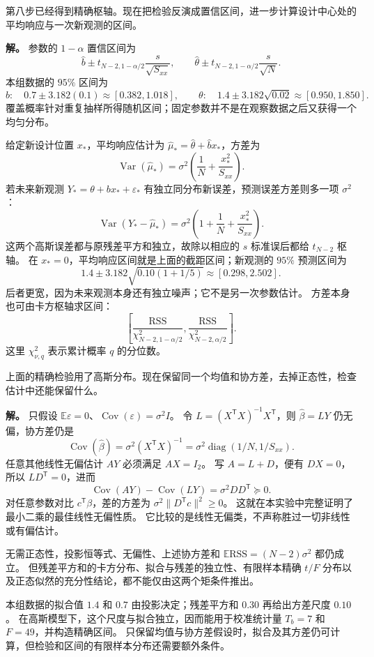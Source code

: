 \begin{exbox}[参数置信区间与新观测预测区间]
第八步已经得到精确枢轴。现在把检验反演成置信区间，进一步计算设计中心处的平均响应与一次新观测的区间。

\textbf{解。} 参数的 $1-\alpha$ 置信区间为
\[
 \widehat b\pm t_{N-2,1-\alpha/2}\frac{s}{\sqrt{S_{xx}}},
 \qquad \widehat\theta\pm t_{N-2,1-\alpha/2}\frac{s}{\sqrt N}.
\]
本组数据的 $95\%$ 区间为
\[
 b:\quad0.7\pm3.182(0.1)\approx[0.382,1.018],
 \qquad
 \theta:\quad1.4\pm3.182\sqrt{0.02}\approx[0.950,1.850].
\]
覆盖概率针对重复抽样所得随机区间；固定参数并不是在观察数据之后又获得一个均匀分布。

给定新设计位置 $x_*$，平均响应估计为 $\widehat\mu_*=\widehat\theta+\widehat b x_*$，方差为
\[
 \operatorname{Var}(\widehat\mu_*)
 =\sigma^2\left(\frac1N+\frac{x_*^2}{S_{xx}}\right).
\]
若未来新观测 $Y_*=\theta+b x_*+\varepsilon_*$ 有独立同分布新误差，预测误差方差则多一项 $\sigma^2$：
\[
 \operatorname{Var}(Y_*-\widehat\mu_*)
 =\sigma^2\left(1+\frac1N+\frac{x_*^2}{S_{xx}}\right).
\]
这两个高斯误差都与原残差平方和独立，故除以相应的 $s$ 标准误后都给 $t_{N-2}$ 枢轴。
在 $x_*=0$，平均响应区间就是上面的截距区间；新观测的 $95\%$ 预测区间为
\[
 1.4\pm3.182\sqrt{0.10(1+1/5)}
 \approx[0.298,2.502].
\]
后者更宽，因为未来观测本身还有独立噪声；它不是另一次参数估计。
方差本身也可由卡方枢轴求区间：
\[
 \left[\frac{\mathrm{RSS}}{\chi^2_{N-2,1-\alpha/2}},
       \frac{\mathrm{RSS}}{\chi^2_{N-2,\alpha/2}}\right].
\]
这里 $\chi^2_{\nu,q}$ 表示累计概率 $q$ 的分位数。
\end{exbox}

\begin{exbox}
上面的精确检验用了高斯分布。现在保留同一个均值和协方差，去掉正态性，检查估计中还能保留什么。

\textbf{解。} 只假设 $\mathbb E\varepsilon=0$、$\operatorname{Cov}(\varepsilon)=\sigma^2I$。
令 $L=(X^{\mathsf T}X)^{-1}X^{\mathsf T}$，则 $\widehat\beta=LY$ 仍无偏，协方差仍是
\[
 \operatorname{Cov}(\widehat\beta)
 =\sigma^2(X^{\mathsf T}X)^{-1}
 =\sigma^2\operatorname{diag}(1/N,1/S_{xx}).
\]
任意其他线性无偏估计 $AY$ 必须满足 $AX=I_2$。
写 $A=L+D$，便有 $DX=0$，所以 $LD^{\mathsf T}=0$，进而
\[
 \operatorname{Cov}(AY)-\operatorname{Cov}(LY)
 =\sigma^2DD^{\mathsf T}\succeq0.
\]
对任意参数对比 $c^{\mathsf T}\beta$，差的方差为 $\sigma^2\|D^{\mathsf T}c\|^2\ge0$。
这就在本实验中完整证明了最小二乘的最佳线性无偏性质。
它比较的是线性无偏类，不声称胜过一切非线性或有偏估计。

无需正态性，投影恒等式、无偏性、上述协方差和 $\mathbb E\mathrm{RSS}=(N-2)\sigma^2$ 都仍成立。
但残差平方和的卡方分布、拟合与残差的独立性、有限样本精确 $t/F$ 分布以及正态似然的充分性结论，都不能仅由这两个矩条件推出。

本组数据的拟合值 $1.4$ 和 $0.7$ 由投影决定；残差平方和 $0.30$ 再给出方差尺度 $0.10$。
在高斯模型下，这个尺度与拟合独立，因而能用于校准统计量 $T_b=7$ 和 $F=49$，并构造精确区间。
只保留均值与协方差假设时，拟合及其方差仍可计算，但检验和区间的有限样本分布还需要额外条件。
\end{exbox}
